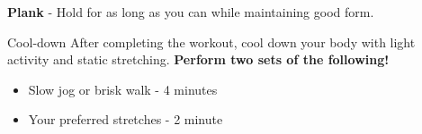 \documentclass{article}
\newcounter{workout}
\newcounter{exercise}
\begin{document}
\begin{tcolorbox}[colback=gray!15,colframe=black,enforce breakable,pad at break*=5mm,boxrule=0.5mm]
		\begin{exercisebox}
			\textbf{Plank} - Hold for as long as you can while maintaining good form. 
		\end{exercisebox}
		
		\begin{workoutbox}{Cool-down}
			After completing the workout, cool down your body with light activity and static stretching. \textbf{Perform two sets of the following!}
			
			\begin{itemize}[label=\textcolor{blue!70}{\textbullet}, itemsep=0pt]
				\item Slow jog or brisk walk - 4 minutes
				\item Your preferred stretches - 2 minute
			\end{itemize}
		\end{workoutbox}
		
	\end{tcolorbox}
	
\end{document}

